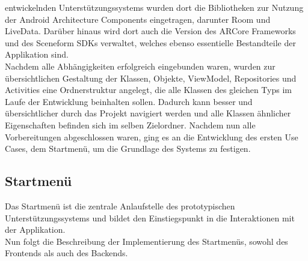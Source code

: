 entwickelnden Unterstützungssystems wurden dort die Bibliotheken zur Nutzung der Android Architecture Components eingetragen, darunter Room und LiveData. 
Darüber hinaus wird dort auch die Version des ARCore Frameworks und des Sceneform \acs{SDK}s verwaltet, welches ebenso essentielle Bestandteile der 
Applikation sind.
\\ 
Nachdem alle Abhängigkeiten erfolgreich eingebunden waren, wurden zur übersichtlichen Gestaltung der Klassen, Objekte, ViewModel, Repositories und Activities 
eine Ordnerstruktur angelegt, die alle Klassen des gleichen Typs im Laufe der Entwicklung beinhalten sollen. Dadurch kann besser und übersichtlicher durch 
das Projekt navigiert werden und alle Klassen ähnlicher Eigenschaften befinden sich im selben Zielordner. Nachdem nun alle Vorbereitungen abgeschlossen 
waren, ging es an die Entwicklung des ersten Use Cases, dem Startmenü, um die Grundlage des Systems zu festigen.  

\subsection{Startmenü}
Das Startmenü ist die zentrale Anlaufstelle des prototypischen Unterstützungssystems und bildet den Einstiegspunkt in die Interaktionen mit der Applikation.
\\ 
Nun folgt die Beschreibung der Implementierung des Startmenüs, sowohl des Frontends als auch des Backends.

